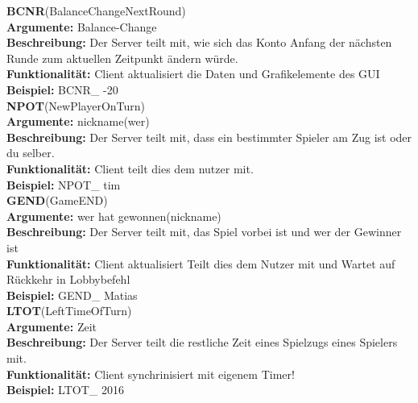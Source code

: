 \documentclass[a4paper, 12pt, oneside, headsepline=.5pt,footsepline=.5pt]{scrartcl}
\begin{document}
{\large \textbf{BCNR}(BalanceChangeNextRound)} \\
\hspace{4ex} \textbf{Argumente:} {Balance-Change} \\
\hspace{4ex} \textbf{Beschreibung:} {Der Server teilt mit, wie sich das Konto Anfang der nächsten Runde zum aktuellen Zeitpunkt ändern würde.} \\
\hspace{4ex} \textbf{Funktionalität:} {Client aktualisiert die Daten und Grafikelemente des GUI} \\
\hspace{4ex} \textbf{Beispiel:} {BCNR\_ -20} \\

{\large \textbf{NPOT}(NewPlayerOnTurn)} \\
\hspace{4ex} \textbf{Argumente:} {nickname(wer)} \\
\hspace{4ex} \textbf{Beschreibung:} {Der Server teilt mit, dass ein bestimmter Spieler am Zug ist oder du selber.} \\
\hspace{4ex} \textbf{Funktionalität:} {Client teilt dies dem nutzer mit.} \\
\hspace{4ex} \textbf{Beispiel:} {NPOT\_ tim} \\

{\large \textbf{GEND}(GameEND)} \\
\hspace{4ex} \textbf{Argumente:} {wer hat gewonnen(nickname)} \\
\hspace{4ex} \textbf{Beschreibung:} {Der Server teilt mit, das Spiel vorbei ist und wer der Gewinner ist} \\
\hspace{4ex} \textbf{Funktionalität:} {Client aktualisiert Teilt dies dem Nutzer mit und Wartet auf Rückkehr in Lobbybefehl} \\
\hspace{4ex} \textbf{Beispiel:} {GEND\_ Matias} \\

{\large \textbf{LTOT}(LeftTimeOfTurn)} \\
\hspace{4ex} \textbf{Argumente:} {Zeit} \\
\hspace{4ex} \textbf{Beschreibung:} {Der Server teilt die restliche Zeit eines Spielzugs eines Spielers mit. } \\
\hspace{4ex} \textbf{Funktionalität:} {Client synchrinisiert mit eigenem Timer!} \\
\hspace{4ex} \textbf{Beispiel:} {LTOT\_ 2016} \\
\end{document}
